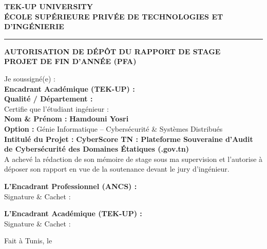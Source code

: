 \newpage
\thispagestyle{empty}

\begin{center}
    {\large \textbf{TEK-UP UNIVERSITY}}\\[1mm]
    {\small \textbf{ÉCOLE SUPÉRIEURE PRIVÉE DE TECHNOLOGIES ET D'INGÉNIERIE}}\\[3mm]
    {\color{tekupPurple}\rule{0.8\textwidth}{1pt}}
\end{center}

\vspace{1.5cm}

\begin{center}
    {\Large \textbf{AUTORISATION DE DÉPÔT DU RAPPORT DE STAGE}}\\[2mm]
    {\large \textbf{PROJET DE FIN D'ANNÉE (PFA)}}
\end{center}

\vspace{1.2cm}

\noindent Je soussigné(e) : \\[3mm]
\textbf{Encadrant Académique (TEK-UP) :} \dotfill \\[3mm]
\textbf{Qualité / Département :} \dotfill \\[6mm]
Certifie que l'étudiant ingénieur : \\[3mm]
\textbf{Nom \& Prénom :} \textbf{Hamdouni Yosri} \\[3mm]
\textbf{Option :} Génie Informatique -- Cybersécurité \& Systèmes Distribués \\[3mm]
\textbf{Intitulé du Projet :} \textbf{CyberScore TN : Plateforme Souveraine d'Audit de Cybersécurité des Domaines Étatiques (.gov.tn)} \\[6mm]
A achevé la rédaction de son mémoire de stage sous ma supervision et l'autorise à déposer son rapport en vue de la soutenance devant le jury d'ingénieur.

\vspace{2.5cm}

\noindent
\begin{minipage}[t]{0.45\textwidth}
    \textbf{L'Encadrant Professionnel (ANCS) :}\\[2mm]
    Signature \& Cachet :
\end{minipage}
\hfill
\begin{minipage}[t]{0.45\textwidth}
    \textbf{L'Encadrant Académique (TEK-UP) :}\\[2mm]
    Signature \& Cachet :
\end{minipage}

\vfill
\begin{center}
    \small Fait à Tunis, le \dotfill
\end{center}
